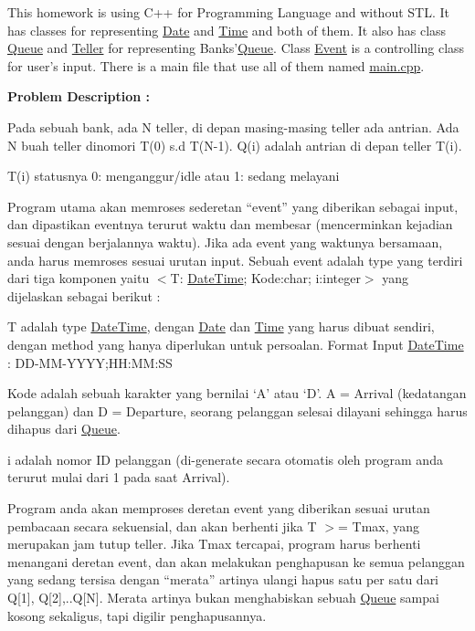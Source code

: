 This homework is using C++ for Programming Language and without S\-T\-L. It has classes for representing \hyperlink{class_date}{Date} and \hyperlink{class_time}{Time} and both of them. It also has class \hyperlink{class_queue}{Queue} and \hyperlink{class_teller}{Teller} for representing Banks'\hyperlink{class_queue}{Queue}. Class \hyperlink{class_event}{Event} is a controlling class for user's input. There is a main file that use all of them named \hyperlink{main_8cpp}{main.\-cpp}.

{\bfseries Problem Description \-:}\par
 Pada sebuah bank, ada N teller, di depan masing-\/masing teller ada antrian. Ada N buah teller dinomori T(0) s.\-d T(N-\/1). Q(i) adalah antrian di depan teller T(i).\par


T(i) statusnya 0\-: menganggur/idle atau 1\-: sedang melayani\par


Program utama akan memroses sederetan “event” yang diberikan sebagai input, dan dipastikan eventnya terurut waktu dan membesar (mencerminkan kejadian sesuai dengan berjalannya waktu). Jika ada event yang waktunya bersamaan, anda harus memroses sesuai urutan input. Sebuah event adalah type yang terdiri dari tiga komponen yaitu $<$T\-: \hyperlink{class_date_time}{Date\-Time}; Kode\-:char; i\-:integer$>$ yang dijelaskan sebagai berikut \-: \par
 
\begin{DoxyEnumerate}
\item T adalah type \hyperlink{class_date_time}{Date\-Time}, dengan \hyperlink{class_date}{Date} dan \hyperlink{class_time}{Time} yang harus dibuat sendiri, dengan method yang hanya diperlukan untuk persoalan. Format Input \hyperlink{class_date_time}{Date\-Time} \-: D\-D-\/\-M\-M-\/\-Y\-Y\-Y\-Y;H\-H\-:\-M\-M\-:S\-S 
\item Kode adalah sebuah karakter yang bernilai ‘\-A’ atau ‘\-D’. A = Arrival (kedatangan pelanggan) dan D = Departure, seorang pelanggan selesai dilayani sehingga harus dihapus dari \hyperlink{class_queue}{Queue}. 
\item i adalah nomor I\-D pelanggan (di-\/generate secara otomatis oleh program anda terurut mulai dari 1 pada saat Arrival). 
\end{DoxyEnumerate}

Program anda akan memproses deretan event yang diberikan sesuai urutan pembacaan secara sekuensial, dan akan berhenti jika T $>$= Tmax, yang merupakan jam tutup teller. Jika Tmax tercapai, program harus berhenti menangani deretan event, dan akan melakukan penghapusan ke semua pelanggan yang sedang tersisa dengan “merata” artinya ulangi hapus satu per satu dari Q\mbox{[}1\mbox{]}, Q\mbox{[}2\mbox{]},..Q\mbox{[}N\mbox{]}. Merata artinya bukan menghabiskan sebuah \hyperlink{class_queue}{Queue} sampai kosong sekaligus, tapi digilir penghapusannya.

